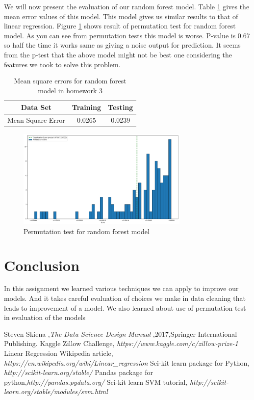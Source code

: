 \documentclass[a4paper, 11pt]{article}
\begin{document}
We will now present the evaluation of our random forest model. Table \ref{table:3} gives the mean error values of this model. This model gives us similar results to that of linear regression. Figure \ref{fig:res3} shows result of permutation test for random forest model. As you can see from permutation tests this model is worse. P-value is 0.67 so half the time it works same as giving a noise output for prediction. It seems from the p-test that the above model might not be best one considering the features we took to solve this problem.
\begin{table}[h!]
\centering
\begin{tabular}{||c c c ||} 
 \hline
 Data Set & Training &  Testing \\ [0.5ex] 
 \hline\hline
 Mean Square Error & 0.0265  & 0.0239\\ [1ex] 
 \hline
\end{tabular}
\caption{Mean square errors for random forest model in homework 3}
\label{table:3}
\end{table}
\begin{figure}[h]
    \centering
    \includegraphics[width=0.75\textwidth]{ptest_rf}
    \caption{Permutation test for random forest model }
    \label{fig:res3}
\end{figure}
\section{Conclusion}
In this assignment we learned various techniques we can apply to improve our models. And it takes careful evaluation of choices we make in data cleaning that leads to improvement of a model. We also learned about use of permutation test in evaluation of the models
\begin{thebibliography}{9}
 Steven Skiena ,\emph{The Data Science Design Manual} ,2017,Springer International Publishing.
  Kaggle Zillow Challenge, \emph{https://www.kaggle.com/c/zillow-prize-1}
  Linear Regression Wikipedia article, \emph{https://en.wikipedia.org/wiki/Linear\_regression}
 Sci-kit learn package for Python, \emph{http://scikit-learn.org/stable/}
 Pandas package for python,\emph{http://pandas.pydata.org/}
 Sci-kit learn SVM tutorial, \emph{http://scikit-learn.org/stable/modules/svm.html}
\end{thebibliography}
\listoffigures
\listoftables
\end{document}
